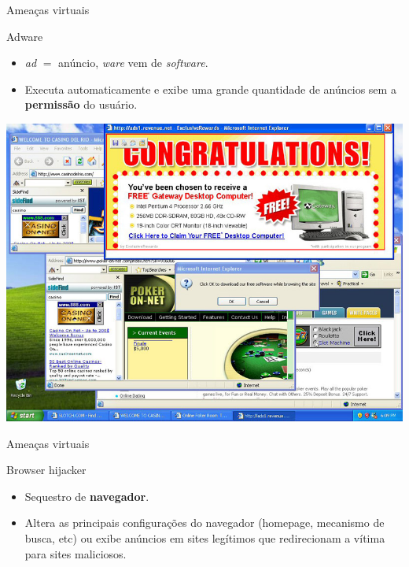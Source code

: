 \begin{frame}{Ameaças virtuais}
	\begin{block}{Adware}
		\begin{itemize}
			\item \textit{ad} $ = $ anúncio, \textit{ware} vem de \textit{software}.
			\item Executa automaticamente e exibe uma grande quantidade de anúncios sem a \textbf{permissão} do usuário.
		\end{itemize}
	\end{block}

	\centering
	\includegraphics[width=0.6\linewidth]{Figuras/Ch02/fig26}
\end{frame}


\begin{frame}{Ameaças virtuais}
	\begin{block}{Browser hijacker}
		\begin{itemize}
			\item Sequestro de \textbf{navegador}.
			\item Altera as principais configurações do navegador (homepage, mecanismo de busca, etc) ou exibe anúncios em sites legítimos que redirecionam a vítima para sites maliciosos.
		\end{itemize}
	\end{block}

\end{frame}


